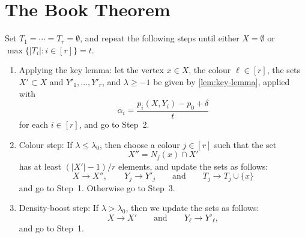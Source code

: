 
\section{The Book Theorem}


\begin{algorithm}\label{alg:book}
  Set \(T_1 = \cdots = T_r = \emptyset\), and repeat the following steps until either \(X = \emptyset\) or \(\max\big\{ |T_i| : i \in [r] \big\} = t\). 
  \begin{enumerate}
  \item\label{Alg:Step1} Applying the key lemma: let the vertex \(x \in X\), the colour \(\ell \in [r]\), the sets \(X' \subset X\) and \(Y'_1,\ldots,Y'_r\), and \(\lambda \ge -1\) be given by \autoref{lem:key-lemma}, applied with
  \begin{equation}\label{def:alpha}
  \alpha_i = \frac{p_i(X,Y_i) - p_0 + \delta}{t}
  \end{equation}
  for each \(i \in [r]\), and go to Step~2.\smallskip
  \item\label{Alg:Step2} Colour step: If \(\lambda \le \lambda_0\), then choose a colour \(j \in [r]\) such that the set
  \begin{equation*}
    X'' = N_j(x) \cap X'
  \end{equation*}
  has at least \((|X'| - 1)/r\) elements, and update the sets as follows:
  \begin{equation*}
    X \to X'', \qquad Y_j \to Y'_j \qquad \text{and} \qquad T_j \to T_j \cup \{x\}
  \end{equation*}
  and go to Step~1. Otherwise go to Step~3.\smallskip
  \item\label{Alg:Step3} Density-boost step: If \(\lambda > \lambda_0\), then we update the sets as follows:
  \begin{equation*}
    X \to X' \qquad \text{and} \qquad Y_\ell \to Y'_\ell,
  \end{equation*}
  and go to Step~1.
  \end{enumerate}  
\end{algorithm}

